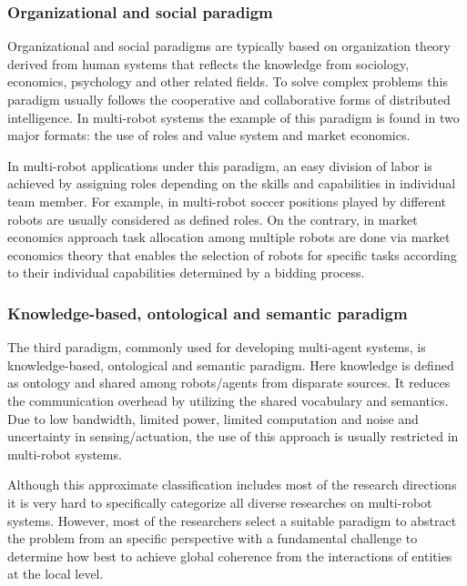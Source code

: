\subsubsection*{Organizational and social paradigm}
Organizational and social paradigms are typically based on organization theory derived from human systems that reflects the knowledge from sociology, economics, psychology and other related fields. To solve complex problems this paradigm usually follows the cooperative and collaborative forms of distributed intelligence. In multi-robot systems the example of this  paradigm is found in two major formats: 
the use of roles and value system and
market economics.

In multi-robot applications under this paradigm, an easy division of labor is achieved by assigning roles depending on the skills and capabilities in individual team member. For example, in multi-robot soccer \cite{Stone+1999,Asada+1999} positions played by different robots are usually considered as defined roles. On the contrary, in market economics approach \cite{Gerkey+2002,Dias+2006} task allocation among multiple robots are done via market economics theory that enables the selection of robots for specific tasks according to their individual capabilities determined by a bidding process.

\subsubsection*{Knowledge-based, ontological and semantic paradigm}
The third paradigm, commonly used for developing multi-agent systems, is knowledge-based, ontological and semantic paradigm. Here knowledge is defined as ontology and shared among robots/agents from disparate sources. It reduces the communication overhead by utilizing the shared vocabulary and semantics. Due to low bandwidth, limited power, limited computation and noise and uncertainty in sensing/actuation, the use of this approach is usually restricted in multi-robot systems. 

Although this approximate classification includes most of the research directions it is very hard to specifically categorize all diverse researches on multi-robot systems. However, most of the researchers select  a suitable paradigm to abstract the problem from an specific perspective with a fundamental challenge to determine how best to achieve global coherence  from the interactions of entities at the local level. 

